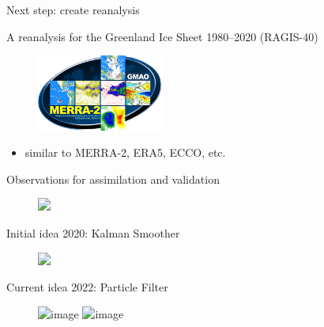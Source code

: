 \documentclass[hide notes,intlimits]{beamer}
\begin{document}
\begin{frame}{Next step: create reanalysis}
  \begin{block}{A reanalysis for the Greenland Ice Sheet 1980--2020 (RAGIS-40)}
    \begin{figure}
      \includegraphics[height=2.5cm]{merra2-logo}
    \end{figure}
    \begin{itemize}
      \item similar to MERRA-2, ERA5, ECCO, etc.
    \end{itemize}
  \end{block}
\end{frame}


\begin{frame}{Observations for assimilation and validation}
  \begin{figure}
    \includegraphics<1->[width=\textwidth]{observation-timeline}
  \end{figure}
\end{frame}

\begin{frame}{Initial idea 2020: Kalman Smoother}
  \begin{figure}
    \includegraphics<1->[width=\textwidth]{flowchart-kalman-smoother}
  \end{figure}
\end{frame}

\begin{frame}{Current idea 2022: Particle Filter}
  \begin{figure}
    \includegraphics<1>[width=\textwidth]{flowchart-particle-filter}
    \includegraphics<2>[width=\textwidth]{flowchart-particle-filter-tasks}
  \end{figure}
\end{frame}
\end{document}
